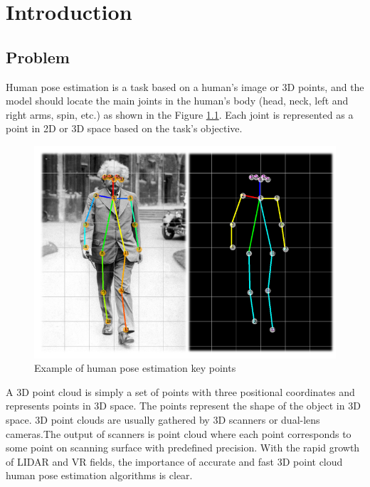 
\chapter{Introduction} %

\label{Introduction}


\section{Problem}
Human pose estimation is a task based on a human's image or 3D points, and the model should locate the main joints in the human's body (head, neck, left and right arms, spin, etc.) as shown in the Figure  \ref{example}. Each joint is represented as a point in 2D or 3D space based on the task's objective.

\begin{figure}[htbp]
\centerline{\includegraphics[scale=.5]{Figures/introduction-einstein.png}}
\caption{Example of human pose estimation key points \cite{rovai_realtime_2020}}
\label{example}
\end{figure}

A 3D point cloud is simply a set of points with three positional coordinates and represents points in 3D space. The points represent the shape of the object in 3D space. 3D point clouds are usually gathered by 3D scanners or dual-lens cameras.The output of scanners is point cloud where each point corresponds to some point on scanning surface with predefined precision. With the rapid growth of LIDAR and VR fields, the importance of accurate and fast 3D point cloud human pose estimation algorithms is clear.

